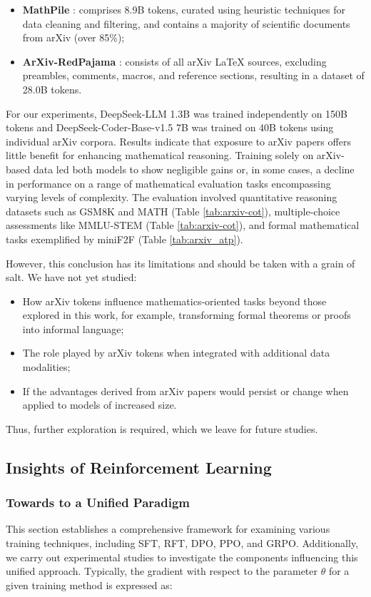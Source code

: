\begin{itemize}[topsep=0pt]
\begin{itemize}[topsep=0pt]
\begin{itemize}[topsep=0pt]
    \item \textbf{MathPile} \citep{mathpile}: comprises 8.9B tokens, curated using heuristic techniques for data cleaning and filtering, and contains a majority of scientific documents from arXiv (over 85\%);
    \item \textbf{ArXiv-RedPajama} \citep{redpajama}: consists of all arXiv LaTeX sources, excluding preambles, comments, macros, and reference sections, resulting in a dataset of 28.0B tokens.
\end{itemize}

For our experiments, DeepSeek-LLM 1.3B was trained independently on 150B tokens and DeepSeek-Coder-Base-v1.5 7B was trained on 40B tokens using individual arXiv corpora. Results indicate that exposure to arXiv papers offers little benefit for enhancing mathematical reasoning. Training solely on arXiv-based data led both models to show negligible gains or, in some cases, a decline in performance on a range of mathematical evaluation tasks encompassing varying levels of complexity. The evaluation involved quantitative reasoning datasets such as GSM8K and MATH (Table \ref{tab:arxiv-cot}), multiple-choice assessments like MMLU-STEM (Table \ref{tab:arxiv-cot}), and formal mathematical tasks exemplified by miniF2F (Table \ref{tab:arxiv_atp}).

However, this conclusion has its limitations and should be taken with a grain of salt. We have not yet studied:

\begin{itemize}[topsep=0pt]
    \item How arXiv tokens influence mathematics-oriented tasks beyond those explored in this work, for example, transforming formal theorems or proofs into informal language;
    \item The role played by arXiv tokens when integrated with additional data modalities;
    \item If the advantages derived from arXiv papers would persist or change when applied to models of increased size.
\end{itemize}

Thus, further exploration is required, which we leave for future studies.

\subsection{Insights of Reinforcement Learning}
\subsubsection{Towards to a Unified Paradigm} This section establishes a comprehensive framework for examining various training techniques, including SFT, RFT, DPO, PPO, and GRPO. Additionally, we carry out experimental studies to investigate the components influencing this unified approach. Typically, the gradient with respect to the parameter $\theta$ for a given training method is expressed as:


\end{itemize}
\end{itemize}
